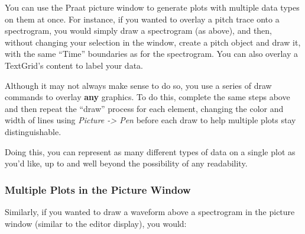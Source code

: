You can use the Praat picture window to generate plots with multiple
data types on them at once. For instance, if you wanted to overlay a
pitch trace onto a spectrogram, you would simply draw a spectrogram (as
above), and then, without changing your selection in the window, create
a pitch object and draw it, with the same ``Time'' boundaries as for the
spectrogram. You can also overlay a TextGrid's content to label your
data.

Although it may not always make sense to do so, you use a series of draw
commands to overlay \textbf{any} graphics. To do this, complete the same
steps above and then repeat the ``draw'' process for each element,
changing the color and width of lines using \emph{Picture
-\textgreater{} Pen} before each draw to help multiple plots stay
distinguishable.

Doing this, you can represent as many different types of data on a
single plot as you'd like, up to and well beyond the possibility of any
readability.

\hypertarget{multiple-plots-in-the-picture-window}{%
\subsubsection{Multiple Plots in the Picture
Window}\label{multiple-plots-in-the-picture-window}}

Similarly, if you wanted to draw a waveform above a spectrogram in the
picture window (similar to the editor display), you would:

